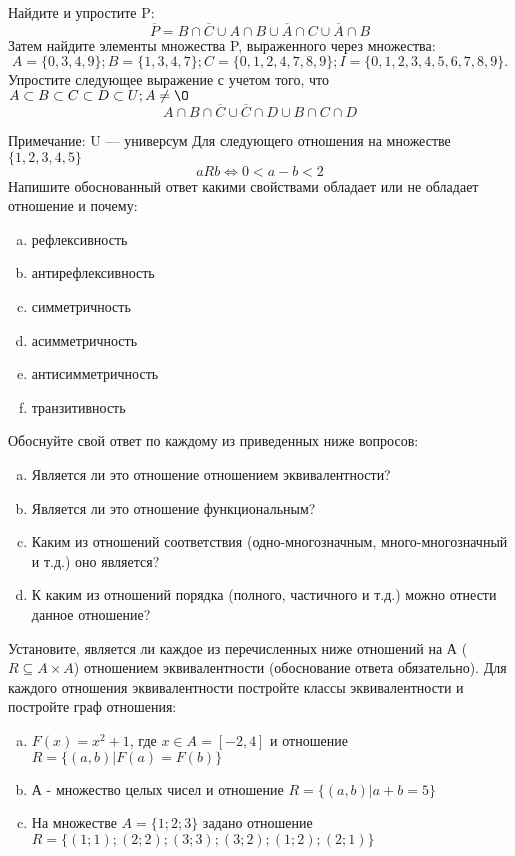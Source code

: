 \documentclass[10pt]{exam}
\begin{document}
\begin{questions}
\question
Найдите и упростите P:
\begin{equation*}
\overline{P} = B \cap \overline{C} \cup A \cap B \cup \overline{A} \cap C \cup \overline{A} \cap B
\end{equation*}
Затем найдите элементы множества P, выраженного через множества:
\begin{equation*}
A = \{0, 3, 4, 9\}; 
B = \{1, 3, 4, 7\};
C = \{0, 1, 2, 4, 7, 8, 9\};
I = \{0, 1, 2, 3, 4, 5, 6, 7, 8, 9\}.
\end{equation*}\question
Упростите следующее выражение с учетом того, что $A\subset B \subset C \subset D \subset U; A \neq \O$
\begin{equation*}
A \cap B  \cap \overline{C} \cup \overline{C} \cap D \cup B \cap C \cap D
\end{equation*}

Примечание: U — универсум\question
Для следующего отношения на множестве $\{1, 2, 3, 4, 5\}$ 
\begin{equation*}
aRb \iff 0 < a-b<2
\end{equation*}
Напишите обоснованный ответ какими свойствами обладает или не обладает отношение и почему:   
\begin{enumerate} [a)]\setcounter{enumi}{0}
\item рефлексивность
\item антирефлексивность
\item симметричность
\item асимметричность
\item антисимметричность
\item транзитивность
\end{enumerate}

Обоснуйте свой ответ по каждому из приведенных ниже вопросов:
\begin{enumerate} [a)]\setcounter{enumi}{0}
    \item Является ли это отношение отношением эквивалентности?
    \item Является ли это отношение функциональным?
    \item Каким из отношений соответствия (одно-многозначным, много-многозначный и т.д.) оно является?
    \item К каким из отношений порядка (полного, частичного и т.д.) можно отнести данное отношение?
\end{enumerate}
\question
Установите, является ли каждое из перечисленных ниже отношений на А ($R \subseteq A \times A$) отношением эквивалентности (обоснование ответа обязательно). Для каждого отношения эквивалентности постройте классы эквивалентности и постройте граф отношения:
\begin{enumerate} [a)]\setcounter{enumi}{0}
\item $F(x)=x^{2}+1$, где $x \in A = [-2, 4]$ и отношение $R = \{(a,b)|F(a) = F(b)\}$
\item А - множество целых чисел и отношение $R = \{(a,b)|a + b = 5\}$
\item На множестве $A = \{1; 2; 3\}$ задано отношение $R = \{(1; 1); (2; 2); (3; 3); (3; 2); (1; 2); (2; 1)\}$


\end{enumerate}
\end{questions}
\end{document}
